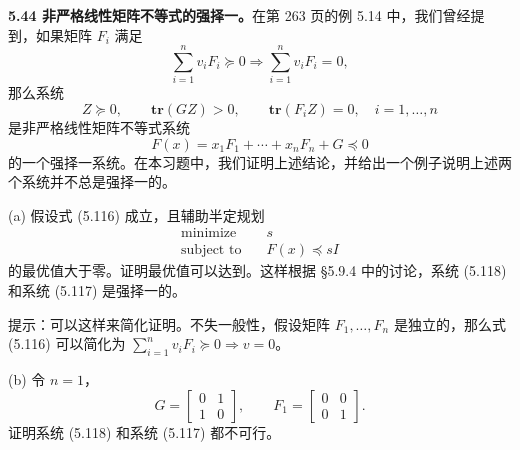 \documentclass[UTF8, 12pt, fontset=fandol, oneside]{ctexart}
\begin{document}
\noindent\textbf{5.44 非严格线性矩阵不等式的强择一。}\quad 在第 263 页的例 5.14 中，我们曾经提到，如果矩阵 $F_i$ 满足
\begin{equation}
\sum_{i=1}^n v_iF_i\succeq 0\Longrightarrow \sum_{i=1}^n v_iF_i=0,
\tag{5.116}
\end{equation}
那么系统
\begin{equation}
Z\succeq 0,\qquad \mathbf{tr}(GZ)>0,\qquad \mathbf{tr}(F_iZ)=0,\quad i=1,\ldots,n
\tag{5.117}
\end{equation}
是非严格线性矩阵不等式系统
\begin{equation}
F(x)=x_1F_1+\cdots+x_nF_n+G\preceq 0
\tag{5.118}
\end{equation}
的一个强择一系统。在本习题中，我们证明上述结论，并给出一个例子说明上述两个系统并不总是强择一的。

(a) 假设式 (5.116) 成立，且辅助半定规划
\[
\begin{aligned}
\text{minimize}\quad & s\\
\text{subject to}\quad & F(x)\preceq sI
\end{aligned}
\]
的最优值大于零。证明最优值可以达到。这样根据 §5.9.4 中的讨论，系统 (5.118) 和系统 (5.117) 是强择一的。

提示：可以这样来简化证明。不失一般性，假设矩阵 $F_1,\ldots,F_n$ 是独立的，那么式 (5.116) 可以简化为 $\sum_{i=1}^n v_iF_i\succeq 0\Longrightarrow v=0$。

(b) 令 $n=1$，
\[
G=
\begin{bmatrix}
0 & 1\\
1 & 0
\end{bmatrix},\qquad
F_1=
\begin{bmatrix}
0 & 0\\
0 & 1
\end{bmatrix}.
\]
证明系统 (5.118) 和系统 (5.117) 都不可行。
\end{document}
